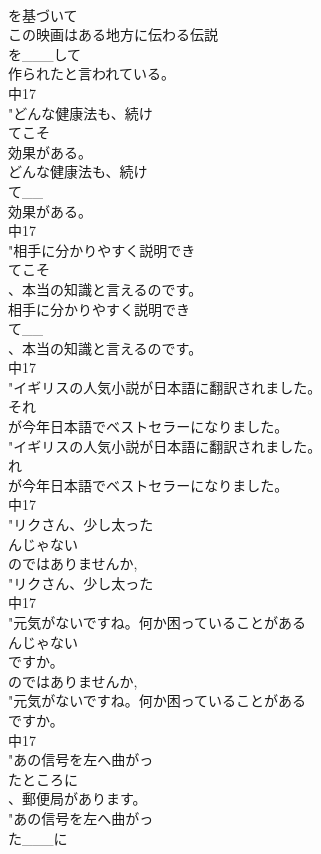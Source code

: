 \documentclass[8pt]{extreport}
\begin{document}
\begin{CJK}{UTF8}{min}
\\	を基づいて	
\\	この映画はある地方に伝わる伝説
\\	を___して
\\	作られたと言われている。
\\	中17
\\	"どんな健康法も、続け
\\	てこそ
\\	効果がある。
\\	どんな健康法も、続け
\\	て__
\\	効果がある。
\\	中17
\\	"相手に分かりやすく説明でき
\\	てこそ
\\	、本当の知識と言えるのです。
\\	相手に分かりやすく説明でき
\\	て__
\\	、本当の知識と言えるのです。
\\	中17
\\	"イギリスの人気小説が日本語に翻訳されました。
\\	それ
\\	が今年日本語でベストセラーになりました。
\\	"イギリスの人気小説が日本語に翻訳されました。
\\	れ
\\	が今年日本語でベストセラーになりました。
\\	中17
\\	"リクさん、少し太った
\\	んじゃない
\\	のではありませんか, 
\\	"リクさん、少し太った
\\	中17
\\	"元気がないですね。何か困っていることがある
\\	んじゃない
\\	ですか。
\\	のではありませんか, 
\\	"元気がないですね。何か困っていることがある
\\	ですか。
\\	中17
\\	"あの信号を左へ曲がっ
\\	たところに
\\	、郵便局があります。
\\	"あの信号を左へ曲がっ
\\	た___に

\end{CJK}
\end{document}
